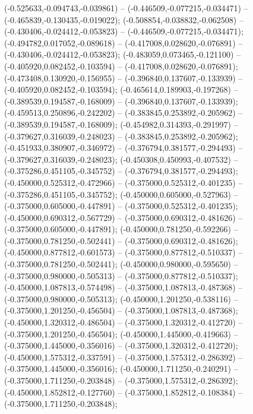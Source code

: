  (-0.525633,-0.094743,-0.039861) -- (-0.446509,-0.077215,-0.034471) -- (-0.465839,-0.130435,-0.019022);
 (-0.508854,-0.038832,-0.062508) -- (-0.430406,-0.024412,-0.053823) -- (-0.446509,-0.077215,-0.034471);
 (-0.494782,0.017052,-0.089618) -- (-0.417008,0.028620,-0.076891) -- (-0.430406,-0.024412,-0.053823);
 (-0.483059,0.073465,-0.121100) -- (-0.405920,0.082452,-0.103594) -- (-0.417008,0.028620,-0.076891);
 (-0.473408,0.130920,-0.156955) -- (-0.396840,0.137607,-0.133939) -- (-0.405920,0.082452,-0.103594);
 (-0.465614,0.189903,-0.197268) -- (-0.389539,0.194587,-0.168009) -- (-0.396840,0.137607,-0.133939);
 (-0.459513,0.250896,-0.242202) -- (-0.383845,0.253892,-0.205962) -- (-0.389539,0.194587,-0.168009);
 (-0.454982,0.314393,-0.291997) -- (-0.379627,0.316039,-0.248023) -- (-0.383845,0.253892,-0.205962);
 (-0.451933,0.380907,-0.346972) -- (-0.376794,0.381577,-0.294493) -- (-0.379627,0.316039,-0.248023);
 (-0.450308,0.450993,-0.407532) -- (-0.375286,0.451105,-0.345752) -- (-0.376794,0.381577,-0.294493);
 (-0.450000,0.525312,-0.472966) -- (-0.375000,0.525312,-0.401235) -- (-0.375286,0.451105,-0.345752);
 (-0.450000,0.605000,-0.527963) -- (-0.375000,0.605000,-0.447891) -- (-0.375000,0.525312,-0.401235);
 (-0.450000,0.690312,-0.567729) -- (-0.375000,0.690312,-0.481626) -- (-0.375000,0.605000,-0.447891);
 (-0.450000,0.781250,-0.592266) -- (-0.375000,0.781250,-0.502441) -- (-0.375000,0.690312,-0.481626);
 (-0.450000,0.877812,-0.601573) -- (-0.375000,0.877812,-0.510337) -- (-0.375000,0.781250,-0.502441);
 (-0.450000,0.980000,-0.595650) -- (-0.375000,0.980000,-0.505313) -- (-0.375000,0.877812,-0.510337);
 (-0.450000,1.087813,-0.574498) -- (-0.375000,1.087813,-0.487368) -- (-0.375000,0.980000,-0.505313);
 (-0.450000,1.201250,-0.538116) -- (-0.375000,1.201250,-0.456504) -- (-0.375000,1.087813,-0.487368);
 (-0.450000,1.320312,-0.486504) -- (-0.375000,1.320312,-0.412720) -- (-0.375000,1.201250,-0.456504);
 (-0.450000,1.445000,-0.419663) -- (-0.375000,1.445000,-0.356016) -- (-0.375000,1.320312,-0.412720);
 (-0.450000,1.575312,-0.337591) -- (-0.375000,1.575312,-0.286392) -- (-0.375000,1.445000,-0.356016);
 (-0.450000,1.711250,-0.240291) -- (-0.375000,1.711250,-0.203848) -- (-0.375000,1.575312,-0.286392);
 (-0.450000,1.852812,-0.127760) -- (-0.375000,1.852812,-0.108384) -- (-0.375000,1.711250,-0.203848);
